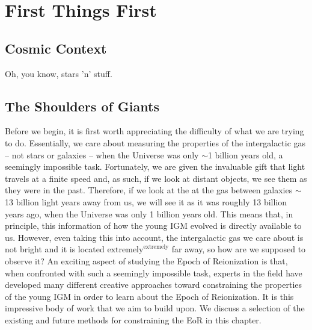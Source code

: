 


\ifpdf
    \graphicspath{{introduction/figures/PNG/}{introduction/figures/PDF/}{introduction/figures/}}
\else
    \graphicspath{{introduction/figures/EPS/}{introduction/figures/}}
\fi

\chapter{First Things First}
\section{Cosmic Context}\label{sec:CosmicContext}


Oh, you know, stars 'n' stuff.

\section{The Shoulders of Giants} 

Before we begin, it is first worth appreciating the difficulty of what we are trying to do. Essentially, we care about measuring the properties of the intergalactic gas -- not stars or galaxies -- when the Universe was only $\sim$1 billion years old, a seemingly impossible task. Fortunately, we are given the invaluable gift that light travels at a finite speed and, as such, if we look at distant objects, we see them as they were in the past. Therefore, if we look at the at the gas between galaxies $\sim$13 billion light years away from us, we will see it as it was roughly 13 billion years ago, when the Universe was only 1 billion years old. This means that, in principle, this information of how the young IGM evolved is directly available to us. However, even taking this into account, the intergalactic gas we care about is not bright and it is located $\text{extremely}^{\text{extremely}}$ far away, so how are we supposed to observe it? An exciting aspect of studying the Epoch of Reionization is that, when confronted with such a seemingly impossible task, experts in the field have developed many different creative approaches toward constraining the properties of the young IGM in order to learn about the Epoch of Reionization. It is this impressive body of work that we aim to build upon. We discuss a selection of the existing and future methods for constraining the EoR in this chapter.

